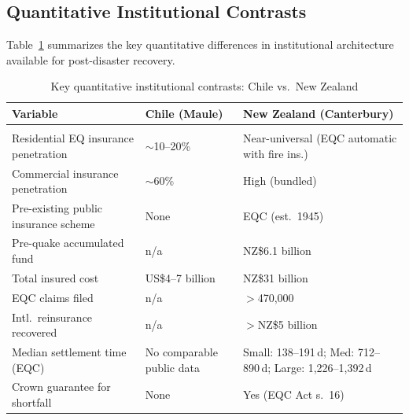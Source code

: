 \documentclass[12pt]{article}
\begin{document}
\subsection{Quantitative Institutional Contrasts}

Table~\ref{tab:quantcontrasts} summarizes the key quantitative differences in institutional architecture available for post-disaster recovery.

\begin{table}[!htbp]
\centering
\caption{Key quantitative institutional contrasts: Chile vs.\ New Zealand}
\label{tab:quantcontrasts}
\footnotesize
\begin{tabular}{@{}
  >{\raggedright\arraybackslash}p{}
  >{\raggedright\arraybackslash}p{}
  >{\raggedright\arraybackslash}p{}
@{}}
\toprule
\textbf{Variable} &
\textbf{Chile (Maule)} &
\textbf{New Zealand (Canterbury)} \\
\midrule

\multicolumn{3}{@{}l}{\textit{\textbf{A. Insurance architecture}}} \\
\addlinespace[2pt]

Residential EQ insurance penetration &
${\sim}$10--20\% &
Near-universal (EQC automatic with fire ins.) \\

Commercial insurance penetration &
${\sim}$60\% &
High (bundled) \\

Pre-existing public insurance scheme &
None &
EQC (est.\ 1945) \\

Pre-quake accumulated fund &
n/a &
NZ\$6.1 billion \parencite{eqc2017annual} \\

Total insured cost &
US\$4--7 billion &
NZ\$31 billion \parencite{ICNZ2024} \\

EQC claims filed &
n/a &
$>$470,000 \\

Intl.\ reinsurance recovered &
n/a &
$>$NZ\$5 billion \parencite{NHC2024} \\

Median settlement time (EQC) &
No comparable public data &
Small: 138--191\,d; Med: 712--890\,d; Large: 1,226--1,392\,d \parencite{Khakurel2021} \\

Crown guarantee for shortfall &
None &
Yes (EQC Act s.\ 16) \\


\end{tabular}
\end{table}
\end{document}
